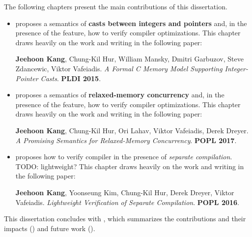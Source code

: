 The following chapters present the main contributions of this dissertation.
%
\begin{itemize}
\item {} proposes a semantics of \textbf{casts between integers and pointers}
  and, in the presence of the feature, how to verify compiler optimizations.  This chapter draws
  heavily on the work and writing in the following paper:

  \cite{intptrcast} \textbf{Jeehoon Kang}, Chung-Kil Hur, William Mansky, Dmitri Garbuzov, Steve
  Zdancewic, Viktor Vafeiadis.  \emph{A Formal C Memory Model Supporting Integer-Pointer Casts}.
  \textbf{PLDI 2015}.

\item {} proposes a semantics of \textbf{relaxed-memory concurrency} and, in the
  presence of the feature, how to verify compiler optimizations.  This chapter draws heavily on the
  work and writing in the following paper:

  \cite{promising} \textbf{Jeehoon Kang}, Chung-Kil Hur, Ori Lahav, Viktor Vafeiadis, Derek Dreyer.
  \emph{A Promising Semantics for Relaxed-Memory Concurrency}.  \textbf{POPL 2017}.

\item {} proposes how to verify compiler in the presence of \emph{separate
    compilation}.  TODO: lightweight?  This chapter draws heavily on the work and writing in the
  following paper:

  \cite{sepcomp} \textbf{Jeehoon Kang}, Yoonseung Kim, Chung-Kil Hur, Derek Dreyer, Viktor
  Vafeiadis.  \emph{Lightweight Verification of Separate Compilation}.  \textbf{POPL 2016}.
\end{itemize}

This dissertation concludes with , which summarizes the contributions and their
impacts () and future work ().


%



